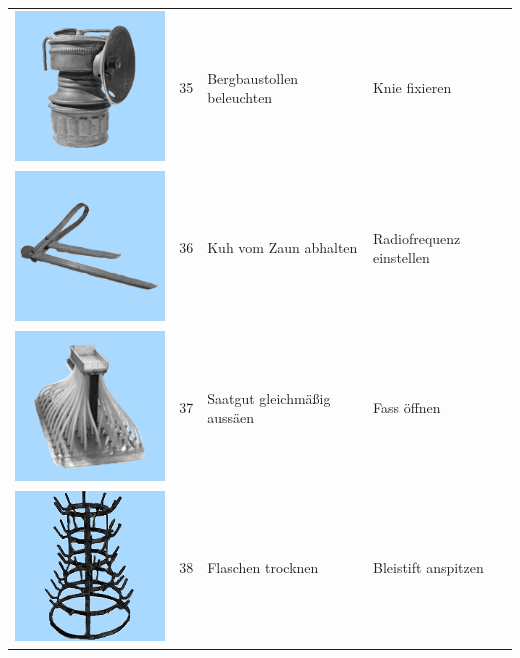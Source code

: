 \documentclass[
  english,
  doc,12pt,twoside,floatsintext]{apa7}
\begin{document}
\begin{center}
\begin{ThreePartTable}
\begin{longtable}{llll}
\includegraphics[valign=c, scale=0.19]{../materials/unfamiliar/35.png} & 35 & Bergbaustollen beleuchten & Knie fixieren\\
\includegraphics[valign=c, scale=0.19]{../materials/unfamiliar/36.png} & 36 & Kuh vom Zaun abhalten & Radiofrequenz einstellen\\
\includegraphics[valign=c, scale=0.19]{../materials/unfamiliar/37.png} & 37 & Saatgut gleichmäßig aussäen & Fass öffnen\\
\includegraphics[valign=c, scale=0.19]{../materials/unfamiliar/38.png} & 38 & Flaschen trocknen & Bleistift anspitzen\\

\end{longtable}
\end{ThreePartTable}
\end{center}
\end{document}
